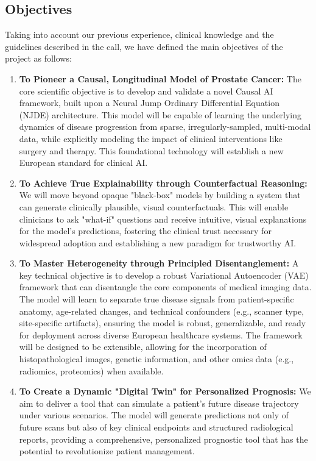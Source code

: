 \documentclass[11pt, a4paper]{article}
\begin{document}
\subsection{Objectives}
Taking into account our previous experience, clinical knowledge and the guidelines described in the call, we have defined the main objectives of the project as follows:
\begin{enumerate}
    \item \textbf{To Pioneer a Causal, Longitudinal Model of Prostate Cancer:} The core scientific objective is to develop and validate a novel Causal AI framework, built upon a Neural Jump Ordinary Differential Equation (NJDE) architecture. This model will be capable of learning the underlying dynamics of disease progression from sparse, irregularly-sampled, multi-modal data, while explicitly modeling the impact of clinical interventions like surgery and therapy. This foundational technology will establish a new European standard for clinical AI.

    \item \textbf{To Achieve True Explainability through Counterfactual Reasoning:} We will move beyond opaque "black-box" models by building a system that can generate clinically plausible, visual counterfactuals. This will enable clinicians to ask "what-if" questions and receive intuitive, visual explanations for the model's predictions, fostering the clinical trust necessary for widespread adoption and establishing a new paradigm for trustworthy AI.

    \item \textbf{To Master Heterogeneity through Principled Disentanglement:} A key technical objective is to develop a robust Variational Autoencoder (VAE) framework that can disentangle the core components of medical imaging data. The model will learn to separate true disease signals from patient-specific anatomy, age-related changes, and technical confounders (e.g., scanner type, site-specific artifacts), ensuring the model is robust, generalizable, and ready for deployment across diverse European healthcare systems. The framework will be designed to be extensible, allowing for the incorporation of histopathological images, genetic information, and other omics data (e.g., radiomics, proteomics) when available.

    \item \textbf{To Create a Dynamic "Digital Twin" for Personalized Prognosis:} We aim to deliver a tool that can simulate a patient's future disease trajectory under various scenarios. The model will generate predictions not only of future scans but also of key clinical endpoints and structured radiological reports, providing a comprehensive, personalized prognostic tool that has the potential to revolutionize patient management.


\end{enumerate}
\end{document}
